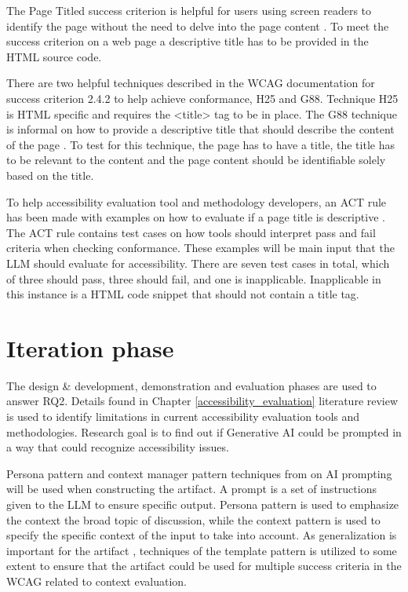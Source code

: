 The Page Titled success criterion is helpful for users using screen readers to identify the page without the need to delve into the page content \citep{wcag_page_titled}. To meet the success criterion on a web page a descriptive title has to be provided in the HTML source code. 

There are two helpful techniques described in the WCAG documentation for success criterion 2.4.2 to help achieve conformance, H25 and G88. Technique H25 is HTML specific and requires the <title> tag to be in place. The G88 technique is informal on how to provide a descriptive title that should describe the content of the page \citep{g88}. To test for this technique, the page has to have a title, the title has to be relevant to the content and the page content should be identifiable solely based on the title.

To help accessibility evaluation tool and methodology developers, an ACT rule has been made with examples on how to evaluate if a page title is descriptive \citep{act_rule_g88}. The ACT rule contains test cases on how tools should interpret pass and fail criteria when checking conformance. These examples will be main input that the LLM should evaluate for accessibility. There are seven test cases in total, which of three should pass, three should fail, and one is inapplicable. Inapplicable in this instance is a HTML code snippet that should not contain a title tag. 

\section{Iteration phase}

The design \& development, demonstration and evaluation phases are used to answer RQ2. Details found in Chapter \ref{accessibility_evaluation} literature review is used to identify limitations in current accessibility evaluation tools and methodologies. Research goal is to find out if Generative AI could be prompted in a way that could recognize accessibility issues. 

Persona pattern and context manager pattern techniques from \textcite{white2023prompt} on AI prompting will be used when constructing the artifact. A prompt is a set of instructions given to the LLM to ensure specific output. Persona pattern is used to emphasize the context the broad topic of discussion, while the context pattern is used to specify the specific context of the input to take into account. As generalization is important for the artifact \citep{design_science_eval}, techniques of the template pattern is utilized to some extent to ensure that the artifact could be used for multiple success criteria in the WCAG related to context evaluation.

